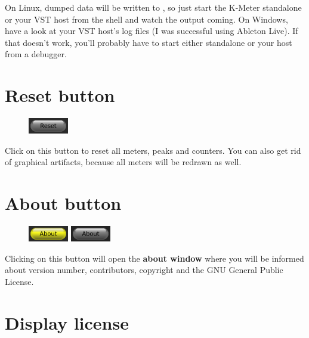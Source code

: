 On Linux, dumped data will be written to , so just start
the K-Meter standalone or your VST host from the shell and watch the
output coming.  On Windows, have a look at your VST host's log files
(I was successful using Ableton Live).  If that doesn't work, you'll
probably have to start either standalone or your host from a debugger.

\newpage %

\section{Reset button}

\begin{figure}
  \includegraphics[scale=\screenshotscale,clip]{include/images/button_reset.png}
\end{figure}

Click on this button to reset all meters, peaks and counters.  You can
also get rid of graphical artifacts, because all meters will be
redrawn as well.

\section{About button}

\begin{figure}
  \includegraphics[scale=\screenshotscale,clip]{include/images/button_about_on.png}
  \newline \vspace{-0.9\baselineskip}
  \includegraphics[scale=\screenshotscale,clip]{include/images/button_about_off.png}
\end{figure}

Clicking on this button will open the \textbf{about window} where you
will be informed about version number, contributors, copyright and the
GNU General Public License.

\section{Display license}

